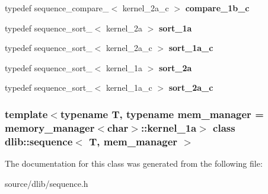 \begin{DoxyCompactItemize}
\item 
\hypertarget{classdlib_1_1sequence_a9a58eae08e46ab23fca2ef5059b481ca}{
typedef sequence\_\-compare\_$<$ kernel\_\-2a\_\-c $>$ {\bfseries compare\_\-1b\_\-c}}
\label{classdlib_1_1sequence_a9a58eae08e46ab23fca2ef5059b481ca}

\item 
\hypertarget{classdlib_1_1sequence_a4736fa9f734e5bc8d7bc18450bb50451}{
typedef sequence\_\-sort\_$<$ kernel\_\-2a $>$ {\bfseries sort\_\-1a}}
\label{classdlib_1_1sequence_a4736fa9f734e5bc8d7bc18450bb50451}

\item 
\hypertarget{classdlib_1_1sequence_aa15e2569df14e3d96c43c893cf05856e}{
typedef sequence\_\-sort\_$<$ kernel\_\-2a\_\-c $>$ {\bfseries sort\_\-1a\_\-c}}
\label{classdlib_1_1sequence_aa15e2569df14e3d96c43c893cf05856e}

\item 
\hypertarget{classdlib_1_1sequence_a3adb6742f350285a395fa03e8a1d6719}{
typedef sequence\_\-sort\_$<$ kernel\_\-1a $>$ {\bfseries sort\_\-2a}}
\label{classdlib_1_1sequence_a3adb6742f350285a395fa03e8a1d6719}

\item 
\hypertarget{classdlib_1_1sequence_a8bcb66474cc939e1794e5f4251109848}{
typedef sequence\_\-sort\_$<$ kernel\_\-1a\_\-c $>$ {\bfseries sort\_\-2a\_\-c}}
\label{classdlib_1_1sequence_a8bcb66474cc939e1794e5f4251109848}

\end{DoxyCompactItemize}
\subsubsection*{template$<$typename T, typename mem\_\-manager = memory\_\-manager$<$char$>$::kernel\_\-1a$>$ class dlib::sequence$<$ T, mem\_\-manager $>$}



The documentation for this class was generated from the following file:\begin{DoxyCompactItemize}
\item 
source/dlib/sequence.h\end{DoxyCompactItemize}
